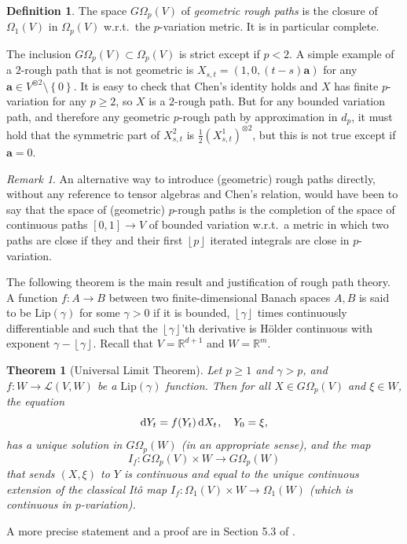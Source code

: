 \documentclass[11pt, letterpaper]{article}
\newtheorem{theorem}{Theorem}
\theoremstyle{definition}
\newtheorem{definition}{Definition}
\theoremstyle{remark}
\newtheorem{remark}{Remark}
\newcommand{\R}{\mathbb{R}}
\newcommand{\m}{\hspace{0.25mm}}
\newcommand{\diff}{\mathop{}\!\mathrm{d}}
\begin{document}
\begin{appendices}
\begin{definition}\label{def:geometricroughpath}
    The space $G \Omega_p(V)$ of \emph{geometric rough paths} is the closure of $\Omega_1(V)$ in $\Omega_p(V)$ w.r.t.\ the $p$-variation metric. It is in particular complete.
\end{definition}

The inclusion $G \Omega_p(V) \subset \Omega_p(V)$ is strict except if $p < 2$. A simple example of a $2$-rough path that is not geometric is $X_{s,t} = (1,0,(t-s) \boldsymbol a)$ for any $\boldsymbol a \in V^{\otimes 2} \setminus \left\{ 0 \right\} $. It is easy to check that Chen's identity holds and $X$ has finite $p$-variation for any $p \ge 2$, so $X$ is a $2$-rough path. But for any bounded variation path, and therefore any geometric $p$-rough path by approximation in $d_p$, it must hold that the symmetric part of $X^{2}_{s,t}$ is $\frac{1}{2} (X^1_{s,t})^{\otimes  2}$, but this is not true except if $\boldsymbol a = 0$.

\begin{remark}
    An alternative way to introduce (geometric) rough paths directly, without any reference to tensor algebras and Chen's relation, would have been to say that the space of (geometric) $p$-rough paths is the completion of the space of continuous paths $[0,1] \to V$ of bounded variation w.r.t.\ a metric in which two paths are close if they and their first $\left\lfloor p \right\rfloor $ iterated integrals are close in $p$-variation.
\end{remark}

The following theorem is the main result and justification of rough path theory. A function $f\colon A \to B$ between two finite-dimensional Banach spaces $A,B$ is said to be $\textrm{Lip}(\gamma)$ for some $\gamma > 0$ if it is bounded, $\left\lfloor \gamma \right\rfloor $ times continuously differentiable and such that the $\left\lfloor \gamma \right\rfloor $'th derivative is H\"{o}lder continuous with exponent $\gamma - \left\lfloor \gamma \right\rfloor $. Recall that $V = \R^{d+1}$ and $W = \R^m$.

\begin{theorem}[Universal Limit Theorem]
\label{thm:universal limit theorem}
    Let $p \ge 1$ and $\gamma > p$, and $f\colon W \to \mathcal{L}(V,W)$ be a $\textrm{Lip}(\gamma)$ function. Then for all $X \in G \Omega_p(V)$ and $\xi \in W$, the equation \[
        \diff Y_t = f(Y_t) \diff X_t\m,\quad Y_0 = \xi,
    \] has a unique solution in $G \Omega_p(W)$ (in an appropriate sense), and the map \[
        I_f\colon G \Omega_p(V) \times W \to G \Omega_p(W)
    \] that sends $(X,\xi)$ to $Y$ is continuous and equal to the unique continuous extension of the classical It\^o map $I_f \colon \Omega_1(V) \times W \to \Omega_1(W)$ (which is continuous in $p$-variation).
\end{theorem}
A more precise statement and a proof are in Section 5.3 of \cite{terrystflour}.


\end{appendices}
\end{document}
